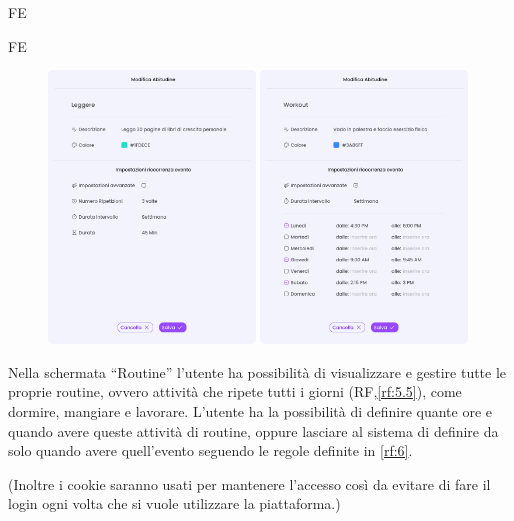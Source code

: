 \begin{listaPersonale}{FE}
\begin{listaPersonale2}{FE}
        \begin{center} 
            \begin{figure}[H]
            \centering\includegraphics[width=0.49\textwidth,height=0.35\textheight]{img/FrontEnd/Abitudini/Modifica/ModificaAbitudine.png}
            \centering\includegraphics[width=0.49\textwidth,height=0.35\textheight]{img/FrontEnd/Abitudini/Modifica/ModificaAbitudineAvv.png}
            \end{figure}
        \end{center}

    \end{listaPersonale2}


     Nella schermata “Routine” l’utente ha possibilità di visualizzare e gestire tutte le proprie routine, ovvero attività che ripete tutti i giorni (RF,\ref{rf:5.5}), come dormire, mangiare e lavorare. L’utente ha la possibilità di definire quante ore e quando avere queste attività di routine, oppure lasciare al sistema di definire da solo quando avere quell’evento seguendo le regole definite in \ref{rf:6}.
    

\end{listaPersonale}


(Inoltre i cookie saranno usati per mantenere l'accesso così da evitare di fare il login ogni volta che si vuole utilizzare la piattaforma.)